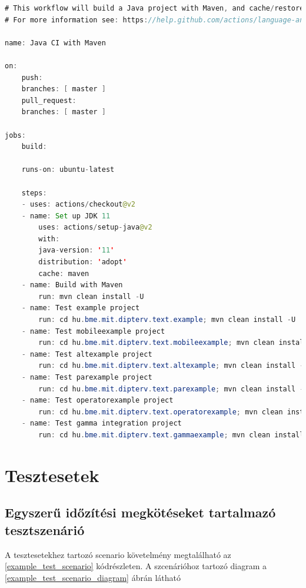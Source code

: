 \begin{lstlisting}[language=java, frame=single, float=ht!, caption={Github Actions CI-hoz tartozó .yml script.},captionpos=b,label=ci_script]
# This workflow will build a Java project with Maven, and cache/restore any dependencies to improve the workflow execution time
# For more information see: https://help.github.com/actions/language-and-framework-guides/building-and-testing-java-with-maven

name: Java CI with Maven

on:
    push:
    branches: [ master ]
    pull_request:
    branches: [ master ]

jobs:
    build:

    runs-on: ubuntu-latest

    steps:
    - uses: actions/checkout@v2
    - name: Set up JDK 11
        uses: actions/setup-java@v2
        with:
        java-version: '11'
        distribution: 'adopt'
        cache: maven
    - name: Build with Maven
        run: mvn clean install -U
    - name: Test example project
        run: cd hu.bme.mit.dipterv.text.example; mvn clean install -U
    - name: Test mobileexample project
        run: cd hu.bme.mit.dipterv.text.mobileexample; mvn clean install -U
    - name: Test altexample project
        run: cd hu.bme.mit.dipterv.text.altexample; mvn clean install -U
    - name: Test parexample project
        run: cd hu.bme.mit.dipterv.text.parexample; mvn clean install -U
    - name: Test operatorexample project
        run: cd hu.bme.mit.dipterv.text.operatorexample; mvn clean install -U
    - name: Test gamma integration project
        run: cd hu.bme.mit.dipterv.text.gammaexample; mvn clean install -U
\end{lstlisting}

\clearpage\section{Tesztesetek}\subsection{Egyszerű időzítési megkötéseket tartalmazó tesztszenárió}

A tesztesetekhez tartozó scenario követelmény megtalálható az \ref{example_test_scenario} kódrészleten.
A szcenárióhoz tartozó diagram a \ref{example_test_scenario_diagram} ábrán látható

